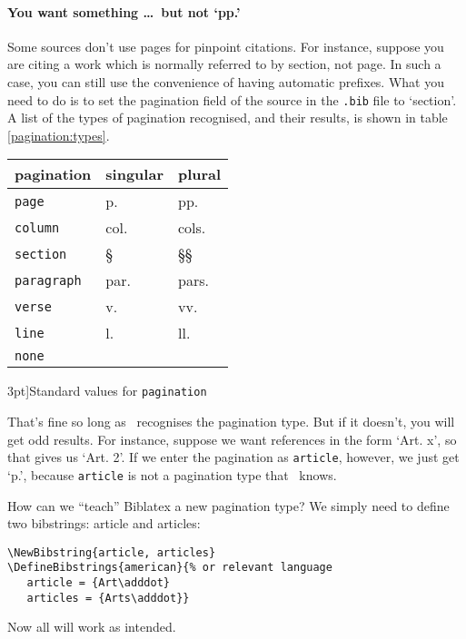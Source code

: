 \paragraph{You want something \ldots\ but not `pp.'} Some sources
don't use pages for pinpoint citations. For instance, suppose you are
citing a work which is normally referred to by section, not page. In
such a case, you can still use the convenience of having automatic
prefixes. What you need to do is to set the pagination field of the
source in the \texttt{.bib} file to `section'. A list of the types of
pagination recognised, and their results, is shown in table
\ref{pagination:types}.
\begin{margintable}
\begin{tabular}{lll}
  \toprule
  \textsf{pagination} & \textsf{singular} & \textsf{plural} \\
  \midrule
  \texttt{page}       & p.                & pp.             \\
  \texttt{column}     & col.              & cols.           \\
  \texttt{section}    & \S                & \S\S            \\
  \texttt{paragraph}  & par.              & pars.           \\
  \texttt{verse}      & v.                & vv.             \\
  \texttt{line}       & l.                & ll.             \\
  \texttt{none}                                             \\
  \bottomrule
\end{tabular}
\caption[][3pt]{Standard values for \texttt{pagination}\label{pagination:types}}
\end{margintable}


That’s fine so long as \biblatex\ recognises the pagination type. But if
it doesn’t, you will get odd results. For instance, suppose we want
references in the form `Art. x', so that  gives us
`Art. 2'. If we enter the pagination as \texttt{article}, however, we
just get `p.', because \texttt{article} is not a
pagination type that \biblatex\ knows.

How can we “teach” Biblatex a new pagination type? We simply need to
define two bibstrings: article and articles:

\begin{verbatim}
\NewBibstring{article, articles}
\DefineBibstrings{american}{% or relevant language
   article = {Art\adddot}
   articles = {Arts\adddot}}
\end{verbatim}
Now all will work as intended. 

